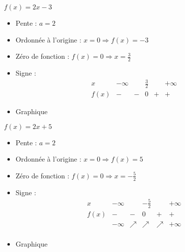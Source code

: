 \begin{solution}
$f(x)=2x-3$
\begin{itemize}
\item Pente :	$a=2$
\item Ordonnée à l’origine :	$x=0\Rightarrow f(x)=-3$
\item Zéro de fonction :	$f(x)=0\Rightarrow x=\frac{3}{2}$
\item Signe :	
$$\begin{array}{l|l|l|l|l|l}
x    & -\infty &   & \frac{3}{2} &   & +\infty \\
\hline
f(x) & -       & - & 0  & + & +      
\end{array}$$
\item Graphique
\end{itemize}
\end{solution}

\begin{solution}
$f(x)=2x+5$
\begin{itemize}
\item Pente :	$a=2$
\item Ordonnée à l’origine :	$x=0\Rightarrow f(x)=5$
\item Zéro de fonction :	$f(x)=0\Rightarrow x=-\frac{5}{2}$
\item Signe :	
$$\begin{array}{l|l|l|l|l|l}
x    & -\infty &   & -\frac{5}{2} &   & +\infty \\
\hline
f(x) & -       & - & 0  & + & +   \\
 & -\infty & \nearrow & \nearrow & \nearrow & +\infty \\   
\end{array}$$
\item Graphique
\end{itemize}
\end{solution}

